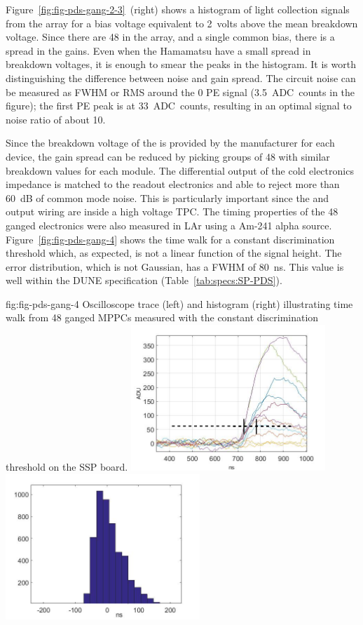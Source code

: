 Figure~\ref{fig:fig-pds-gang-2-3}~(right) shows a histogram of light collection signals from the array for a bias voltage equivalent to \SI{2}{volts} above the mean breakdown voltage. Since there are 48  in the array, and a single common bias, there is a spread in the gains. Even when the Hamamatsu  have a small spread in breakdown voltages, it is enough to smear the peaks in the histogram. It is worth distinguishing the difference between noise and gain spread. The circuit noise can be measured as FWHM or RMS around the 0 PE signal (\SI{3.5}{ADC counts} in the figure); the first PE peak is at \SI{33}{ADC counts}, resulting in an optimal signal to noise ratio of about 10.

Since the breakdown voltage of the  is provided by the manufacturer for each device, the gain spread can be reduced by picking groups of 48  with similar breakdown values for each module. The differential output of the cold electronics impedance is matched to the readout electronics and able to reject more than \SI{60}{dB} of common mode noise. This is particularly important since the  and output wiring are inside a high voltage TPC. The timing properties of the 48 ganged electronics were also measured in LAr using a Am-241 alpha source. 
Figure~\ref{fig:fig-pds-gang-4} shows the time walk for a constant discrimination threshold which, as expected, is not a linear function of the signal height. The error distribution, which is not Gaussian, has a FWHM of \SI{80}{ns}. This value is well within the DUNE specification (Table~\ref{tab:specs:SP-PDS}).

\begin{dunefigure}
 {fig:fig-pds-gang-4}
 {Oscilloscope trace (left) and histogram (right) illustrating time walk from 48 ganged MPPCs measured with the constant discrimination threshold on the SSP board.}
\includegraphics[height=5.5cm]{graphics/pds-gang-time-walk.jpg}
\includegraphics[height=5.5cm]{graphics/pds-gang-time-walk-hist.jpg}
\end{dunefigure}



